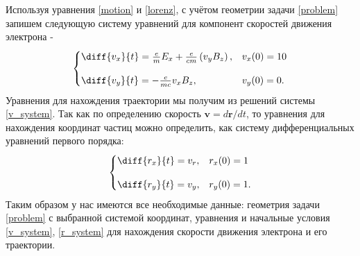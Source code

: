 \documentclass[a4paper]{article}
\begin{document}
Используя уравнения \eqref{motion} и \eqref{lorenz}, с учётом геометрии задачи \ref{problem} запишем следующую систему уравнений для компонент скоростей движения электрона - 
\begin{equation}\label{v_system}
\begin{cases}
\diff{v_x}{t} = \frac{e}{m}E_x + \frac{e}{cm}\left(v_yB_z\right),	& 	v_x(0) = 10 \\[10pt]
\diff{v_y}{t} = -\frac{e}{mc} v_x B_z,					&	v_y(0) = 0 . \\
\end{cases}
\end{equation}
Уравнения для нахождения траектории мы получим из решений системы \eqref{v_system}. Так как по определению \cite{Landau:mech} скорость $\mathbf{v} = d\mathbf{r}/dt$, то уравнения для нахождения координат частиц можно определить, как систему дифференциальных уравнений первого порядка:
\begin{equation}\label{r_system}
\begin{cases}
\diff{r_x}{t} = v_r, 	&	r_x(0) = 1	\\[10pt]
\diff{r_y}{t} = v_y, 	&	r_y(0) = 1.	\\
\end{cases}
\end{equation}
Таким образом у нас имеются все необходимые данные: геометрия задачи \ref{problem} с выбранной системой координат, уравнения и начальные условия \eqref{v_system}, \eqref{r_system} для нахождения скорости движения электрона и его траектории.
\end{document}
